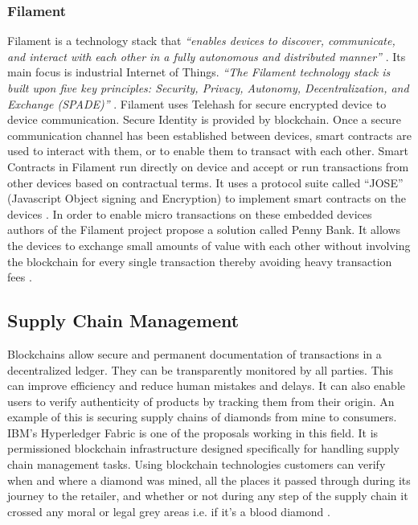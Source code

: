 \subsubsection{Filament} \label{Filament}
Filament is a technology stack that \textit{“enables devices to discover, communicate, and interact with each other in a fully autonomous and distributed manner”} \cite{misc:006}. Its main focus is industrial Internet of Things. \textit{“The Filament technology stack is built upon five key principles: Security, Privacy, Autonomy, Decentralization, and Exchange (SPADE)”} \cite{misc:006}. Filament uses Telehash for secure encrypted device to device communication. Secure Identity is provided by blockchain. Once a secure communication channel has been established between devices, smart contracts are used to interact with them, or to enable them to transact with each other. Smart Contracts in Filament run directly on device and accept or run transactions from other devices based on contractual terms. It uses a protocol suite called “JOSE” (Javascript Object signing and Encryption) to implement smart contracts on the devices \cite{misc:007}. In order to enable micro transactions on these embedded devices authors of the Filament project propose a solution called Penny Bank. It allows the devices to exchange small amounts of value with each other without involving the blockchain for every single transaction thereby avoiding heavy transaction fees \cite{misc:006}.
\vspace{0.5cm}  
\subsection{Supply Chain Management}
Blockchains allow secure and permanent documentation of transactions in a decentralized ledger. They can be transparently monitored by all parties. This can improve efficiency and reduce human mistakes and delays. It can also enable users to verify authenticity of products by tracking them from their origin. An example of this is securing supply chains of diamonds from mine to consumers. IBM’s Hyperledger Fabric is one of the proposals working in this field. It is permissioned blockchain infrastructure designed specifically for handling supply chain management tasks. Using blockchain technologies customers can verify when and where a diamond was mined, all the places it passed through during its journey to the retailer, and whether or not during any step of the supply chain it crossed any moral or legal grey areas i.e. if it’s a blood diamond \cite{misc:014}.
\vspace{0.5cm}  
